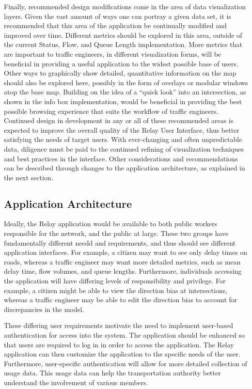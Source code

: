 \documentclass{report}
\begin{document}
Finally, recommended design modifications come in the area of data visualization layers.
Given the vast amount of ways one can portray a given data set, it is recommended that this area of the application be continually modified and improved over time.
Different metrics should be explored in this area, outside of the current Status, Flow, and Queue Length implementation.
More metrics that are important to traffic engineers, in different visualization forms, will be beneficial in providing a useful application to the widest possible base of users.
Other ways to graphically show detailed, quantitative information on the map should also be explored here, possibly in the form of overlays or modular windows atop the base map.
Building on the idea of a ``quick look'' into an intersection, as shown in the info box implementation, would be beneficial in providing the best possible browsing experience that suits the workflow of traffic engineers.
Continued design in development in any or all of these recommended areas is expected to improve the overall quality of the Relay User Interface, thus better satisfying the needs of target users.
With ever-changing and often unpredictable data, diligence must be paid to the continued refining of visualization techniques and best practices in the interface.
Other considerations and recommendations can be described through changes to the application architecture, as explained in the next section.

\subsection{Application Architecture}

Ideally, the Relay application would be available to both public workers responsible for the network, and the public at large. These two groups have fundamentally different needd and requirements, and thus should see different application interfaces. For example, a citizen may want to see only delay times on roads, whereas a traffic engineer may want more detailed metrics, such as mean delay time, flow volumes, and queue lengths. Furthermore, individuals accessing the application will have differing levels of responsibility and privilege. For example, a citizen might be able to view the direction bias at intersections, whereas a traffic engineer may be able to edit the direction bias to account for discrepancies in the model.

These differing user requirements motivate the need to implement user-based authentication for access into the system. The application should be enhanced so that users are required to log in in order to access the application. The Relay application can then customize the application to the specific needs of the user. Furthermore, user-specific authentication will allow for more detailed collection of usage data. This usage data can help the transportation authority better understand the involvement of various members.
\end{document}

